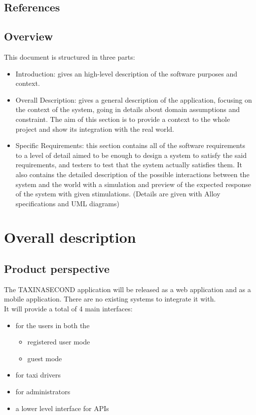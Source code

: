 \documentclass{article}
\begin{document}
\subsection{References}

\subsection{Overview}
This document is structured in three parts:
\begin{itemize}
	\item Introduction: gives an high-level description of the software purposes and context.
	\item Overall Description: gives a general description of the application, focusing on the context of the system, going in details about domain assumptions and constraint. The aim of this section is to provide a context to the whole project and show its integration with the real world.
	\item Specific Requirements: this section contains all of the software requirements to a level of detail aimed to be enough to design a system to satisfy the said requirements, and testers to test that the system actually satisfies them. It also contains the detailed description of the possible interactions between the system and the world with a simulation and preview of the expected response of the system with given stimulations. (Details are given with Alloy specifications and UML diagrams)
\end{itemize}


\section{Overall description}

\subsection{Product perspective}
The TAXINASECOND application will be released as a web application and as a mobile application. 
There are no existing systems to integrate it with. 
\\It will provide a total of 4 main interfaces:
\begin{itemize}
	\item for the users in both the
		\begin{itemize}
			\item registered user mode
			\item guest mode
		\end{itemize}
	\item for taxi drivers 
	\item for administrators
	\item a lower level interface for APIs
\end{itemize}
\end{document}
